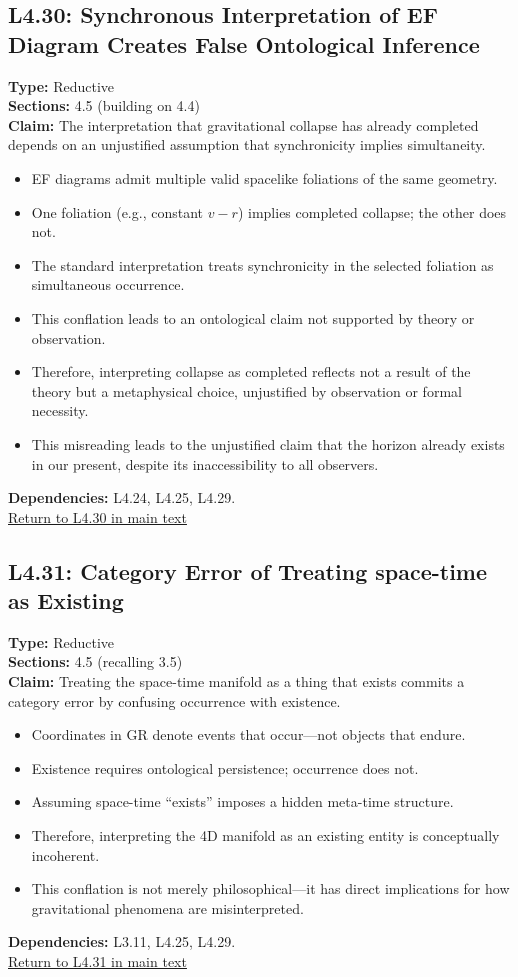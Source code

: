 \documentclass[12pt]{book}
\newcommand{\returnlink}[1]{\hyperref[logic:#1]{Return to #1 in main text}\xspace}
\begin{document}
\subsection*{L4.30: Synchronous Interpretation of EF Diagram Creates False Ontological Inference}
\label{appendix:L4.30}
\textbf{Type:} Reductive \\
\textbf{Sections:} 4.5 (building on 4.4) \\
\textbf{Claim:} The interpretation that gravitational collapse has already completed depends on an unjustified assumption that synchronicity implies simultaneity.
\begin{itemize}
  \item EF diagrams admit multiple valid spacelike foliations of the same geometry.
  \item One foliation (e.g., constant \( v - r \)) implies completed collapse; the other does not.
  \item The standard interpretation treats synchronicity in the selected foliation as simultaneous occurrence.
  \item This conflation leads to an ontological claim not supported by theory or observation.
  \item Therefore, interpreting collapse as completed reflects not a result of the theory but a metaphysical choice, unjustified by observation or formal necessity.
  \item This misreading leads to the unjustified claim that the horizon already exists in our present, despite its inaccessibility to all observers.
\end{itemize}
\textbf{Dependencies:} L4.24, L4.25, L4.29.\\
\returnlink{L4.30}

\subsection*{L4.31: Category Error of Treating space-time as Existing}
\label{appendix:L4.31}
\textbf{Type:} Reductive \\
\textbf{Sections:} 4.5 (recalling 3.5) \\
\textbf{Claim:} Treating the space-time manifold as a thing that exists commits a category error by confusing occurrence with existence.
\begin{itemize}
  \item Coordinates in GR denote events that occur---not objects that endure.
  \item Existence requires ontological persistence; occurrence does not.
  \item Assuming space-time ``exists'' imposes a hidden meta-time structure.
  \item Therefore, interpreting the 4D manifold as an existing entity is conceptually incoherent.
  \item This conflation is not merely philosophical---it has direct implications for how gravitational phenomena are misinterpreted.
\end{itemize}
\textbf{Dependencies:} L3.11, L4.25, L4.29.\\
\returnlink{L4.31}
\end{document}
